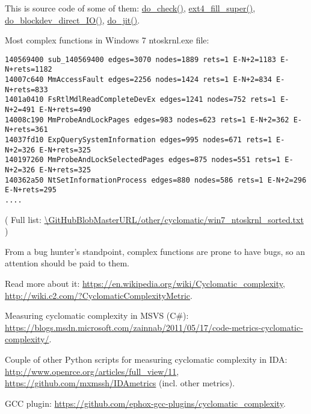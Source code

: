 This is source code of some of them:
\href{https://github.com/torvalds/linux/blob/56868a460b83c0f93d339256a81064d89aadae8e/kernel/bpf/verifier.c\#L2811}{do\_check()},
\href{https://github.com/torvalds/linux/blob/0fcc3ab23d7395f58e8ab0834e7913e2e4314a83/fs/ext4/super.c\#L3358}{ext4\_fill\_super()},
\href{https://github.com/torvalds/linux/blob/86292b33d4b79ee03e2f43ea0381ef85f077c760/fs/direct-io.c\#L1107}{do\_blockdev\_direct\_IO()},
\href{https://github.com/torvalds/linux/blob/bf5f89463f5b3109a72ed13ca62b57e90213387d/arch/x86/net/bpf_jit_comp.c\#L351}{do\_jit()}.

Most complex functions in Windows 7 ntoskrnl.exe file:

\begin{lstlisting}
140569400 sub_140569400 edges=3070 nodes=1889 rets=1 E-N+2=1183 E-N+rets=1182
14007c640 MmAccessFault edges=2256 nodes=1424 rets=1 E-N+2=834 E-N+rets=833
1401a0410 FsRtlMdlReadCompleteDevEx edges=1241 nodes=752 rets=1 E-N+2=491 E-N+rets=490
14008c190 MmProbeAndLockPages edges=983 nodes=623 rets=1 E-N+2=362 E-N+rets=361
14037fd10 ExpQuerySystemInformation edges=995 nodes=671 rets=1 E-N+2=326 E-N+rets=325
140197260 MmProbeAndLockSelectedPages edges=875 nodes=551 rets=1 E-N+2=326 E-N+rets=325
140362a50 NtSetInformationProcess edges=880 nodes=586 rets=1 E-N+2=296 E-N+rets=295
....
\end{lstlisting}

( Full list: \url{\GitHubBlobMasterURL/other/cyclomatic/win7_ntoskrnl_sorted.txt} )

From a bug hunter's standpoint, complex functions are prone to have bugs, so an attention should be paid to them.

Read more about it:
\url{https://en.wikipedia.org/wiki/Cyclomatic_complexity},
\url{http://wiki.c2.com/?CyclomaticComplexityMetric}.

Measuring cyclomatic complexity in MSVS (C\#):
\url{https://blogs.msdn.microsoft.com/zainnab/2011/05/17/code-metrics-cyclomatic-complexity/}.

Couple of other Python scripts for measuring cyclomatic complexity in IDA:
\url{http://www.openrce.org/articles/full_view/11},
\url{https://github.com/mxmssh/IDAmetrics} (incl. other metrics).

GCC plugin:
\url{https://github.com/ephox-gcc-plugins/cyclomatic_complexity}.

